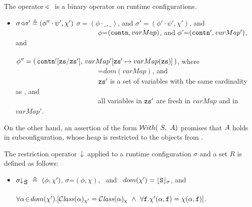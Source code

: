  \begin{definition}  The operator $\adapt$\ \  is a binary operator on runtime configurations.
 \label{def:config:adapt}
 $~ $

\begin{itemize}
\item
$\sigma \adapt \sigma' \triangleq (\phi''\cdot\psi',\chi')$  \IFF $\sigma=(\phi\cdot\_,\_)$, and $\sigma'= (\phi'\cdot\psi',\chi')$, and
 \\
$\ \strut \ \ \hspace{1.45in} $
$\phi$=$(\prg{contn},varMap)$, and $\phi'$=$(\prg{contn}',varMap')$, and
 \\
$\ \strut \ \ \hspace{1.45in} $     %
  $\phi''=(\, \prg{contn}'[\prg{zs}/\prg{zs}' ],\,varMap'[\prg{zs}'\mapsto varMap(\prg{zs})]\, ) $, where
 \\
$\ \strut \ \ \hspace{1.45in} $
=$dom(varMap)$, and
 \\
$\ \strut \ \ \hspace{1.45in} $      $\prg{zs}'$ is a set  of variables with  the  same cardinality as , and
 \\
$\ \strut \ \ \hspace{1.45in} $   all variables in
$\prg{zs}'$  are fresh in $varMap$ and in $varMap'$.


\end{itemize}

\end{definition}

 On the other hand, an assertion of the form $\Using{A}{S}$ promises that $\A$ holds in subconfiguration, whose heap is restricted to the objects from .

 \begin{definition}  The restriction operator~$\;\restrct{} {} $ applied to a runtime configuration $\sigma$ and a set $R$ is defined as follows:
 \label{def:config:restrct}
 $~ $

\begin{itemize}
\item
$\restrct {\sigma}{\prg{S}} \ \triangleq \ (\phi, \chi')$, \IFF  $\sigma$=$(\phi,\chi)$, \ and  \  $dom(\chi')=\interp {\prg{S}} {\sigma}$, and  \\
$\ \strut \ \ \hspace{1.2in} $
 $\forall \alpha\!\in\!dom(\chi').[ \ClassOf {\alpha} {\chi'} =  \ClassOf {\alpha} {\chi}\ \wedge \ \forall \f.  \chi'(\alpha,\f)=\chi(\alpha,\f)]$.
\end{itemize}
\end{definition}

